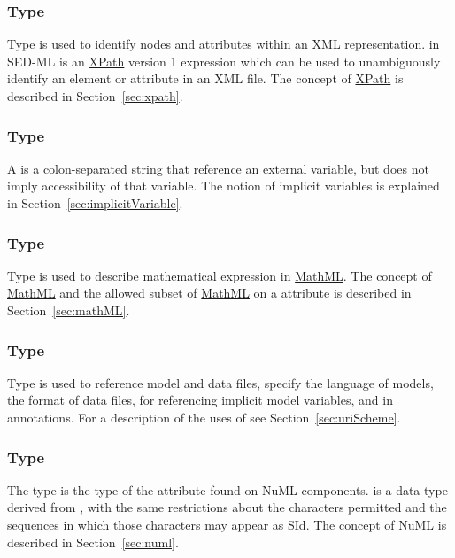 \subsubsection[\element{XPath}]{Type }
\label{type:xpath}
Type  is  used to identify nodes and attributes within an XML representation.  in SED-ML is an \hyperref[sec:xpath]{XPath} version 1 expression which can be used to unambiguously identify an element or attribute in an XML file. The concept of \hyperref[sec:xpath]{XPath} is described in Section~\ref{sec:xpath}.

\begin{blockChanged}
\subsubsection[\element{URN}]{Type }
\label{type:urn}
A  is a colon-separated string that reference an external variable, but does not imply accessibility of that variable.  The notion of implicit variables is explained in Section~\ref{sec:implicitVariable}.
\end{blockChanged}

\subsubsection[\element{MathML}]{Type }
\label{type:mathml}
Type  is used to describe mathematical expression in \hyperref[sec:mathML]{MathML}. The concept of \hyperref[sec:mathML]{MathML} and the allowed subset of \hyperref[sec:mathML]{MathML} on a  attribute is described in Section~\ref{sec:mathML}.

\subsubsection[\element{anyURI}]{Type }
\label{type:anyURI}
Type  is used to reference model and data files, specify the language of models, the format of data files, for referencing implicit model variables, and in annotations. For a description of the uses of  see Section~\ref{sec:uriScheme}.

\subsubsection[\element{NuMLSId}]{Type }
\label{type:numlsid}
The type  is the type of the  attribute found on NuML components.  is a data type derived from \SId, with the same restrictions about the characters permitted and the sequences in which those characters may appear as \hyperref[type:sid]{SId}. The concept of NuML is described in Section~\ref{sec:numl}.

